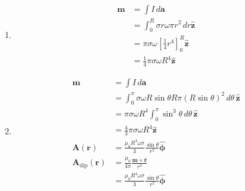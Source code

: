 \documentclass{article}
\renewcommand{\vec}[1]{\boldsymbol{\mathbf{#1}}}
\newcommand{\uvec}[1]{\hat{\vec{#1}}}
\begin{document}
\begin{enumerate}
  \item

        \begin{align*}
          \vec{m} & = \int I \,d \vec{a}                                            \\
                  & = \int_0^R \sigma r \omega \pi r^2 \,d r \uvec{z}               \\
                  & = \pi \sigma \omega \left[ \frac{1}{4} r^4 \right]_0^R \uvec{z} \\
                  & = \frac{1}{4} \pi \sigma \omega R^4 \uvec{z}
        \end{align*}

  \item

        \begin{align*}
          \vec{m}                     & = \int I \,d \vec{a}                                                                   \\
                                      & = \int_0^\pi \sigma \omega R \sin \theta R \pi (R \sin \theta)^2 \,d \theta \,\uvec{z} \\
                                      & = \pi \sigma \omega R^4 \int_0^\pi \sin^3 \theta \,d \theta \,\uvec{z}                 \\
                                      & = \frac{4}{3} \pi \sigma \omega R^4 \uvec{z}                                           \\
          \vec{A}(\vec{r})            & = \frac{\mu_0 R^4 \omega \sigma}{3} \frac{\sin \theta}{r^2} \uvec{\phi}                \\
          \vec{A}_\text{dip}(\vec{r}) & = \frac{\mu_0}{4 \pi} \frac{\vec{m} \times \uvec{r}}{r^2}                              \\
                                      & = \frac{\mu_0 R^4 \omega \sigma}{3} \frac{\sin \theta}{r^2} \uvec{\phi}
        \end{align*}
\end{enumerate}

\setcounter{subsection}{38}
\subsection{}
\end{document}
